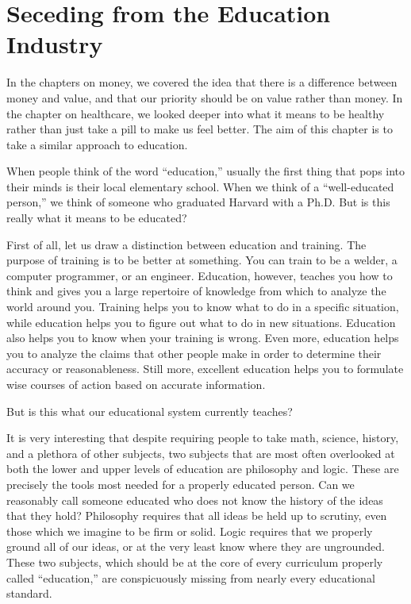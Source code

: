 \chapter{Seceding from the Education Industry}

In the chapters on money, we covered the idea that there is a difference
between money and value, and that our priority should be on value
rather than money. In the chapter on healthcare, we looked deeper into
what it means to be healthy rather than just take a pill to make
us feel better. The
aim of this chapter is to take a similar approach to education.

When people think of the word “education,” usually the first thing that
pops into their minds is their local elementary school. When we think
of a “well-educated person,” we think of someone who graduated Harvard
with a Ph.D. But is this really what it means to be educated?

First of all, let us draw a distinction between education and training.
The purpose of training is to be better at something. You can train to
be a welder, a computer programmer, or an engineer. Education, however,
teaches you how to think and gives you a large repertoire of knowledge
from which to analyze
the world around you. Training helps you to know what to do in a
specific situation, while education helps you to figure out what to do
in new situations. Education also helps you to know when your training
is wrong. Even more, education helps you to analyze the claims that
other people make in order to determine their accuracy or
reasonableness. Still more, excellent education helps you to formulate
wise courses of action based on accurate information.

But is this what our educational system currently teaches?

It is very interesting that despite requiring people to take math,
science, history, and a plethora of other subjects, two subjects that
are most often overlooked at both the lower and upper levels of
education are philosophy and logic. These are precisely the tools most
needed for a properly educated person. Can we reasonably call someone
educated who does not know the history of the ideas that they hold? 
Philosophy requires that all ideas be held up to scrutiny, even those
which we imagine to be firm or solid. Logic requires that we properly
ground all of our ideas, or at the very least know where they are
ungrounded. These two subjects, which should be at the core of every
curriculum properly called “education,” are conspicuously missing from
nearly every educational standard.

